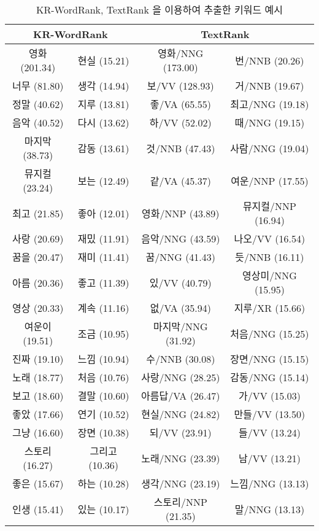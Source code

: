 \documentclass[oneside, ko,phd]{snuthesis_utf8_kor}
\begin{document}
\begin{table}[H]
\centering
\small
\caption{KR-WordRank, TextRank 을 이용하여 추출한 키워드 예시}
\label{tab:krwordrank_keyword_example}
\begin{tabular}{|c|c|c|c|}
\hline
\multicolumn{2}{|c|}{\textbf{KR-WordRank}} & \multicolumn{2}{c|}{\textbf{TextRank}} \\ \hline
영화 (201.34) & 현실 (15.21) & 영화/NNG (173.00) & 번/NNB (20.26) \\ \hline
너무 (81.80) & 생각 (14.94) & 보/VV (128.93) & 거/NNB (19.67) \\ \hline
정말 (40.62) & 지루 (13.81) & 좋/VA (65.55) & 최고/NNG (19.18) \\ \hline
음악 (40.52) & 다시 (13.62) & 하/VV (52.02) & 때/NNG (19.15) \\ \hline
마지막 (38.73) & 감동 (13.61) & 것/NNB (47.43) & 사람/NNG (19.04) \\ \hline
뮤지컬 (23.24) & 보는 (12.49) & 같/VA (45.37) & 여운/NNP (17.55) \\ \hline
최고 (21.85) & 좋아 (12.01) & 영화/NNP (43.89) & 뮤지컬/NNP (16.94) \\ \hline
사랑 (20.69) & 재밌 (11.91) & 음악/NNG (43.59) & 나오/VV (16.54) \\ \hline
꿈을 (20.47) & 재미 (11.41) & 꿈/NNG (41.43) & 듯/NNB (16.11) \\ \hline
아름 (20.36) & 좋고 (11.39) & 있/VV (40.79) & 영상미/NNG (15.95) \\ \hline
영상 (20.33) & 계속 (11.16) & 없/VA (35.94) & 지루/XR (15.66) \\ \hline
여운이 (19.51) & 조금 (10.95) & 마지막/NNG (31.92) & 처음/NNG (15.25) \\ \hline
진짜 (19.10) & 느낌 (10.94) & 수/NNB (30.08) & 장면/NNG (15.15) \\ \hline
노래 (18.77) & 처음 (10.76) & 사랑/NNG (28.25) & 감동/NNG (15.14) \\ \hline
보고 (18.60) & 결말 (10.60) & 아름답/VA (26.47) & 가/VV (15.03) \\ \hline
좋았 (17.66) & 연기 (10.52) & 현실/NNG (24.82) & 만들/VV (13.50) \\ \hline
그냥 (16.60) & 장면 (10.38) & 되/VV (23.91) & 들/VV (13.24) \\ \hline
스토리 (16.27) & 그리고 (10.36) & 노래/NNG (23.39) & 남/VV (13.21) \\ \hline
좋은 (15.67) & 하는 (10.28) & 생각/NNG (23.19) & 느낌/NNG (13.13) \\ \hline
인생 (15.41) & 있는 (10.17) & 스토리/NNP (21.35) & 말/NNG (13.13) \\ \hline
\end{tabular}
\end{table}
\end{document}
